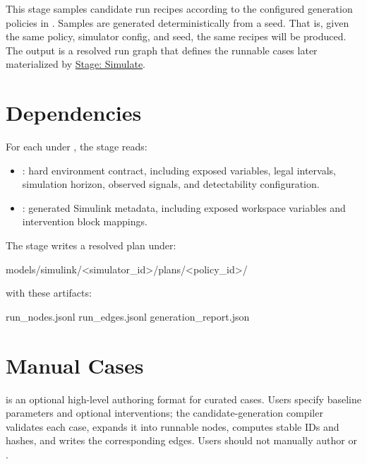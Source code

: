 \documentclass[11pt]{article}
\begin{document}
\label{docstart:candidate_generation}
This stage samples candidate run recipes according to the configured generation policies in \hyperref[sec:generation-policy-schema]{}.
Samples are generated deterministically from a seed. 
That is, given the same policy, simulator config, and seed, the same recipes will be produced.
The output is a resolved run graph that defines the runnable cases later materialized by \hyperref[docstart:simulation_stage]{Stage: Simulate}.

\section*{Dependencies}

For each \termSimulator{} under , the stage reads:

\begin{itemize}
\item {}: hard environment contract, including exposed variables, legal intervals, simulation horizon, observed signals, and detectability configuration.
\item {}: generated Simulink metadata, including exposed workspace variables and intervention block mappings.
\end{itemize}

The stage writes a resolved plan under:

\begin{DocCode}
models/simulink/<simulator_id>/plans/<policy_id>/
\end{DocCode}

with these artifacts:

\begin{DocCode}
run_nodes.jsonl
run_edges.jsonl
generation_report.json
\end{DocCode}

\section*{Manual Cases}

 is an optional high-level authoring format for curated cases.
Users specify baseline parameters and optional interventions; the candidate-generation compiler validates each case, expands it into runnable nodes, computes stable IDs and hashes, and writes the corresponding edges.
Users should not manually author  or .
\end{document}
